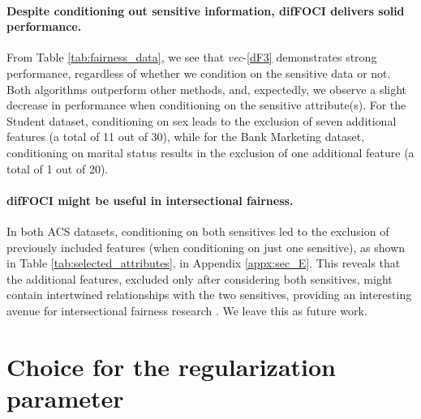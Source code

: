 \paragraph{Despite conditioning out sensitive information, difFOCI delivers solid performance.} From Table \ref{tab:fairness_data}, we see that \textit{vec}-\ref{dF3} demonstrates strong performance, regardless of whether we condition on the sensitive data or not. Both algorithms outperform other methods, and, expectedly, we observe a slight decrease in performance when conditioning on the sensitive attribute(s). For the Student dataset, conditioning on sex leads to the exclusion of seven additional features (a total of 11 out of 30), while for the Bank Marketing dataset, conditioning on marital status results in the exclusion of one additional feature (a total of 1 out of 20). 

\paragraph{difFOCI might be useful in intersectional fairness.} In both ACS datasets, conditioning on both sensitives led to the exclusion of previously included features (when conditioning on just one sensitive), as shown in Table \ref{tab:selected_attributes}, in Appendix \ref{appx:sec_E}. This reveals that the additional features, excluded only after considering both sensitives, might contain intertwined relationships with the two sensitives, providing an interesting avenue for intersectional fairness research \citep{gohar2023survey}. We leave this as future work.

\section{Choice for the regularization parameter}
\label{sec:parameter_beta_choice}


